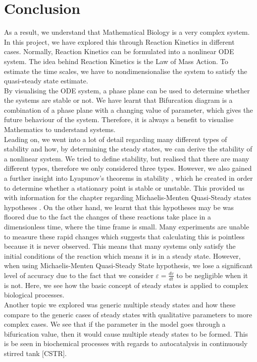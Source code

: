 \documentclass[a4paper]{report}
\theoremstyle{definition}
\begin{document}
\chapter{Conclusion}
As a result,  we understand that Mathematical Biology is a very complex system. In this project, we have explored this through Reaction Kinetics in different cases. Normally, Reaction Kinetics can be formulated into a nonlinear ODE system. The idea behind Reaction Kinetics is the Law of Mass Action. To estimate the time scales, we have to nondimensionalise the system to satisfy the quasi-steady state estimate.
\\
By visualising the ODE system, a phase plane can be used to determine whether the systems are stable or not.  We have learnt that Bifurcation diagram is a combination of a phase plane with a changing value of parameter, which gives the future behaviour of the system. Therefore, it is always a benefit to visualise Mathematics to understand systems.
\\
Leading on, we went into a lot of detail regarding many different types of stability and how, by determining the steady states, we can derive the stability of a nonlinear system. We tried to define stability, but realised that there are many different types, therefore we only considered three types. However, we also gained a further insight into Lyapunov’s theorems in stability , which he created in order to determine whether a stationary point is stable or unstable. This provided us with information for the chapter regarding Michaelis-Menten Quasi-Steady states hypotheses . On the other hand, we learnt that this hypotheses may be was floored due to the fact the changes of these reactions take place in a dimensionless time, where the time frame is small. Many experiments are unable to measure these rapid changes which suggests that calculating this is pointless because it is never observed. This means that many systems only satisfy the initial conditions of the reaction which means it is in a steady state. However, when using Michaelis-Menten Quasi-Steady State hypothesis, we lose a significant level of accuracy due to the fact that we consider $\varepsilon=\frac{dv}{dt}$ to be negligible when it is not. Here, we see how the basic concept of steady states is applied to complex biological processes.
\\
Another topic we explored was generic multiple steady states and how these compare to the generic cases of steady states with qualitative parameters to more complex cases. We see that if the parameter in the model goes through a bifurication value, then it would cause multiple steady states to be formed. This is be seen in biochemical processes with regards to autocatalysis in continuously stirred tank [CSTR]. 
\end{document}
